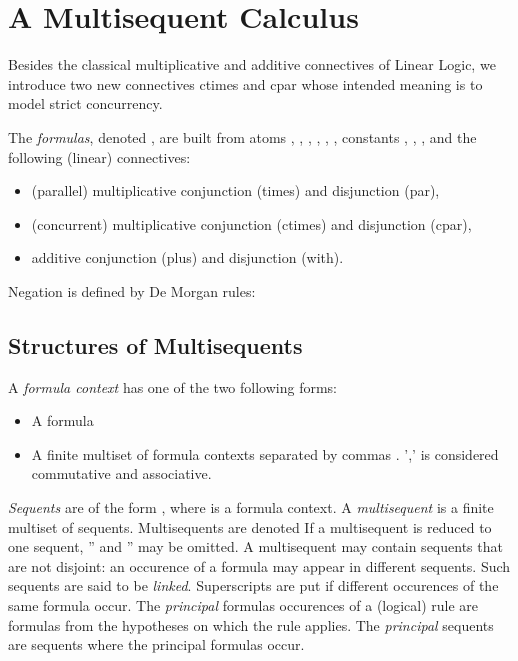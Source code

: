 \documentclass{llncs}
\begin{document}
 
\section{A Multisequent Calculus}\label{sec:calculus}




Besides the classical multiplicative and additive connectives of Linear Logic, we introduce two new connectives ctimes  and cpar  whose intended meaning is to model strict concurrency.

\begin{definition}
The {\em formulas}, denoted , are built from atoms , , 
, , , ,
constants , , ,  and the following (linear) connectives:
\begin{itemize}
\item (parallel) multiplicative conjunction  (times) and 
disjunction  (par),
\item (concurrent) multiplicative conjunction  (ctimes) and 
disjunction  (cpar),
\item additive conjunction  (plus) and disjunction  (with).
\end{itemize}

Negation is defined by De Morgan rules:
\center


\end{definition}

\subsection{Structures of Multisequents}
\begin{definition}
A {\em formula context}  has one of the two following forms:
\begin{itemize}
\item A formula 
\item A finite multiset of formula contexts separated by commas .
',' is considered commutative and associative.
\end{itemize}
{\em Sequents} are of the form , where  is a formula context.
A {\em multisequent} is a finite multiset of sequents. 
Multisequents are denoted  If a multisequent is reduced to one sequent, '' and '' may be omitted.
A multisequent may contain sequents that are not disjoint: an occurence of a formula may appear in different sequents. Such sequents
are said to be {\em linked}. Superscripts are put if different occurences of the same formula occur.
The {\em principal} formulas occurences of a (logical) rule are formulas from the hypotheses on which the rule applies. The {\em principal} sequents are sequents where the principal formulas occur.
\end{definition}
\end{document}
